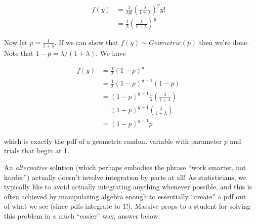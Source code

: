 \documentclass[
  letterpaper,
  DIV=11,
  numbers=noendperiod]{scrreprt}
\begin{document}
\begin{align*}
    f(y) & = \frac{1}{\lambda y!} \left( \frac{\lambda }{1 + \lambda} \right)^y y! \\
    & = \frac{1}{\lambda} \left(\frac{\lambda}{1 + \lambda}\right)^y
\end{align*}

Now let \(p = \frac{1}{1 + \lambda}\). If we can show that
\(f(y) \sim Geometric(p)\) then we're done. Note that
\(1 - p = \lambda/(1 + \lambda)\). We have

\begin{align*}
    f(y) & = \frac{1}{\lambda} (1 - p)^y \\
    & = \frac{1}{\lambda} (1 - p)^{y-1} (1-p) \\
    & = (1 - p)^{y-1} \frac{1}{\lambda} \left( \frac{\lambda}{1 + \lambda} \right) \\
    & = (1 - p)^{y-1} \left( \frac{1}{1 + \lambda} \right) \\
    & = (1 - p)^{y-1} p
\end{align*}

which is exactly the pdf of a geometric random variable with parameter
\(p\) and trials that begin at 1.

An \emph{alternative} solution (which perhaps embodies the phrase ``work
smarter, not harder'') actually doesn't involve integration by parts at
all! As statisticians, we typically like to avoid actually integrating
anything whenever possible, and this is often achieved by manipulating
algebra enough to essentially ``create'' a pdf out of what we see (since
pdfs integrate to \(1\)!). Massive props to a student for solving this
problem in a much ``easier'' way, answer below:
\end{document}
